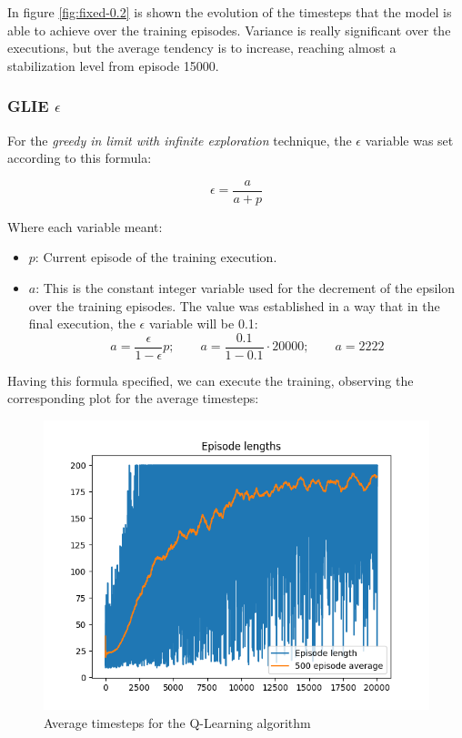 \documentclass[12pt]{article}
\begin{document}
In figure \ref{fig:fixed-0.2} is shown the evolution of the timesteps that the model is able to achieve over the training episodes. Variance is really significant over the executions, but the average tendency is to increase, reaching almost a stabilization level from episode 15000.\\

\subsubsection{GLIE $\epsilon$}

For the \textit{greedy in limit with infinite exploration} technique, the $\epsilon$ variable was set according to this formula:

\begin{equation}
    \epsilon = \frac{a}{a + p}
\end{equation}

Where each variable meant:

\begin{itemize}
    \item $p$: Current episode of the training execution.
    \item $a$: This is the constant integer variable used for the decrement of the epsilon over the training episodes. The value was established in a way that in the final execution, the $\epsilon$ variable will be 0.1:
    \begin{equation}
        a = \frac{\epsilon}{1 - \epsilon}p; \quad \quad a = \frac{0.1}{1-0.1}\cdot20000; \quad \quad a = 2222
    \end{equation}
\end{itemize}

Having this formula specified, we can execute the training, observing the corresponding plot for the average timesteps:

\begin{figure}[h]
    \centering
    \includegraphics[scale=0.6]{exercise-3/plots/episodes-variable-0.0.png}
    \caption{Average timesteps for the Q-Learning algorithm}
    \label{fig:variable}
\end{figure}
\end{document}
